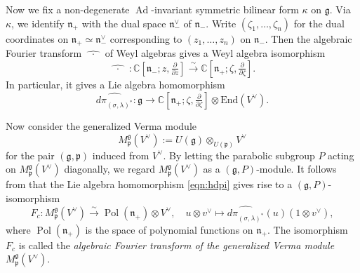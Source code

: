 \documentclass[a4paper,11pt,reqno]{amsart}
\newcommand{\frakg}{\mathfrak{g}}
\newcommand{\frakn}{\mathfrak{n}}
\newcommand{\frakp}{\mathfrak{p}}
\newcommand{\0}{{\bf 0}}
\newcommand{\C}{\mathbb{C}}
\newcommand{\1}{{\bf 1}}
\DeclareMathOperator{\Ad}{Ad}
\DeclareMathOperator{\Pol}{Pol}
\newcommand{\Mp}{M^{\frakg}_{\frakp}}
\DeclareMathOperator{\To}{\longrightarrow}
\theoremstyle{plain}
\theoremstyle{definition}
\numberwithin{equation}{section}
\theoremstyle{definition}
\begin{document}
Now we fix a non-degenerate $\Ad$-invariant symmetric bilinear form $\kappa$ on
$\frakg$. Via $\kappa$, we identify 
$\frakn_+$  with the dual space $\frakn_-^\vee$ of 
$\frakn_-$. 
Write $(\zeta_1, \ldots, \zeta_n)$ for the dual coordinates on 
$\frakn_+\simeq \frakn_-^\vee$ corresponding to $(z_1, \ldots, z_n)$ on $\frakn_-$.
Then
the algebraic Fourier transform $\widehat{\;\;\cdot\;\;}$
of Weyl algebras \cite[Def.\ 3.1]{KoPe16a} gives a Weyl algebra isomorphism
\begin{equation*}
\widehat{\;\;\cdot\;\;}\;\colon
\C[\frakn_-;z, \tfrac{\partial}{\partial z}] 
\stackrel{\sim}{\To} 
\C[\frakn_+;\zeta, \tfrac{\partial}{\partial \zeta}].
\end{equation*}
In particular, it gives a Lie algebra homomorphism
\begin{equation}\label{eqn:hdpi}
\widehat{d\pi_{(\sigma,\lambda)^*}}\colon \mathfrak{g} \To 
\C[\frakn_+;\zeta, \tfrac{\partial}{\partial \zeta}]\otimes \mathrm{End}(V^\vee).
\end{equation}

Now consider the generalized Verma module 
\begin{equation*}
\Mp(V^\vee) := U(\frakg)\otimes_{U(\frakp)}V^\vee
\end{equation*}
for the pair $(\frakg, \frakp)$ induced from $V^\vee$. 
By letting the parabolic subgroup $P$ acting on $\Mp(V^\vee)$ diagonally, we regard
$\Mp(V^\vee)$ as a $(\frakg, P)$-module. It follows from \cite[Sect.\ 3.4]{KoPe16a} that 
the Lie algebra homomorphism \eqref{eqn:hdpi} gives rise to a $(\frakg,P)$-isomorphism 
\begin{equation}\label{eqn:Fc}
F_c\colon \Mp(V^\vee) 
\stackrel{\sim}{\To}
\Pol(\frakn_+) \otimes V^\vee,
\quad u\otimes v^\vee \longmapsto 
\widehat{d\pi_{(\sigma,\lambda)^*}}(u)(1\otimes v^\vee),
\end{equation}
where $\Pol(\frakn_+)$ is the space of polynomial functions on $\frakn_+$.
The isomorphism $F_c$ is called
the \emph{algebraic Fourier transform of the generalized Verma module 
$\Mp(V^\vee)$}.


\end{document}

